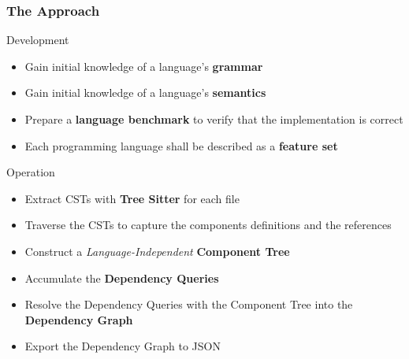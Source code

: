 \documentclass[dvipsnames, 10pt, table]{beamer}
\begin{document}
\begin{frame}
  \frametitle{The Approach}

  \begin{block}{Development}
    \begin{itemize}
      \item Gain initial knowledge of a language's \textbf{grammar}
      \item Gain initial knowledge of a language's \textbf{semantics}
      \item Prepare a \textbf{language benchmark} to verify that the implementation is correct
      \item Each programming language shall be described as a \textbf{feature set}
    \end{itemize}
  \end{block}

  \begin{block}{Operation}
    \begin{itemize}
      \item Extract CSTs with \textbf{Tree Sitter} for each file
      \item \textcolor{ATMRed}{Traverse the CSTs to capture the components definitions and the references}
      \item \textcolor{ATMRed}{Construct a \textit{Language-Independent} \textbf{Component Tree}}
      \item \textcolor{ATMRed}{Accumulate the \textbf{Dependency Queries}}
      \item \textcolor{ATMGreen}{Resolve the Dependency Queries with the Component Tree into the \textbf{Dependency Graph}}
      \item Export the Dependency Graph to JSON
    \end{itemize}
  \end{block}
\end{frame}
\end{document}
